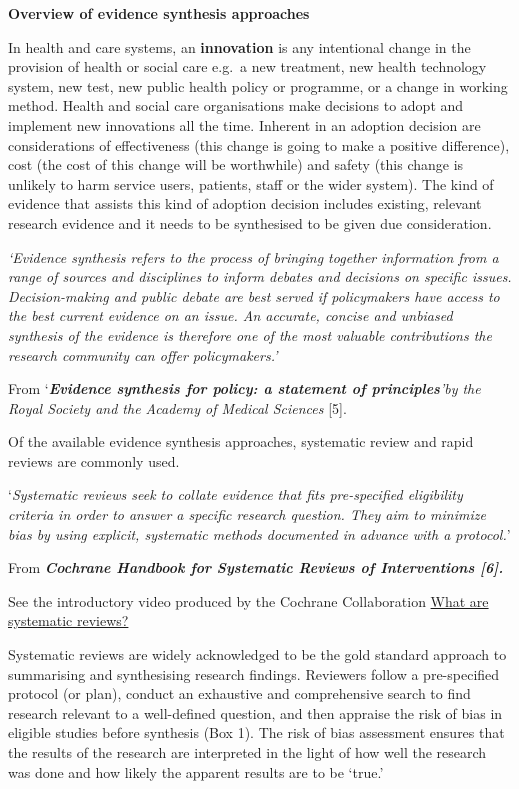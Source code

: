 \documentclass[
  letterpaper,
  DIV=11,
  numbers=noendperiod]{scrreprt}
\begin{document}
\textbf{Overview of evidence synthesis approaches}

In health and care systems, an \textbf{innovation} is any intentional
change in the provision of health or social care e.g.~a new treatment,
new health technology system, new test, new public health policy or
programme, or a change in working method. Health and social care
organisations make decisions to adopt and implement new innovations all
the time. Inherent in an adoption decision are considerations of
effectiveness (this change is going to make a positive difference), cost
(the cost of this change will be worthwhile) and safety (this change is
unlikely to harm service users, patients, staff or the wider system).
The kind of evidence that assists this kind of adoption decision
includes existing, relevant research evidence and it needs to be
synthesised to be given due consideration.

\emph{`Evidence synthesis refers to the process of bringing together
information from a range of sources and disciplines to inform debates
and decisions on specific issues. Decision-making and public debate are
best served if policymakers have access to the best current evidence on
an issue. An accurate, concise and unbiased synthesis of the evidence is
therefore one of the most valuable contributions the research community
can offer policymakers.'}

From `\emph{\textbf{Evidence synthesis for policy: a statement of
principles}'by the Royal Society and the Academy of Medical Sciences}
{[}5{]}.

Of the available evidence synthesis approaches, systematic review and
rapid reviews are commonly used.

`\emph{Systematic reviews seek to collate evidence that fits
pre-specified eligibility criteria in order to answer a specific
research question. They aim to minimize bias by using explicit,
systematic methods documented in advance with a protocol.}'

From \textbf{\emph{Cochrane Handbook for Systematic Reviews of
Interventions {[}6{]}.}}

See the introductory video produced by the Cochrane Collaboration
\href{https://www.youtube.com/watch?v=egJlW4vkb1Y&t=29s}{What are
systematic reviews?}

Systematic reviews are widely acknowledged to be the gold standard
approach to summarising and synthesising research findings. Reviewers
follow a pre-specified protocol (or plan), conduct an exhaustive and
comprehensive search to find research relevant to a well-defined
question, and then appraise the risk of bias in eligible studies before
synthesis (Box 1). The risk of bias assessment ensures that the results
of the research are interpreted in the light of how well the research
was done and how likely the apparent results are to be `true.'
\end{document}

